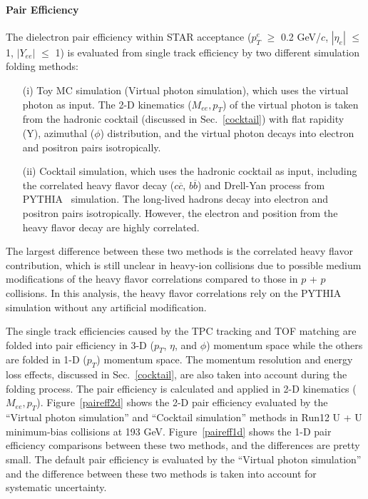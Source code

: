 \paragraph{Pair Efficiency}
The dielectron pair efficiency within STAR acceptance ($p_{T}^{e}$ $\geq$ 0.2 GeV/$c$, $|\eta_{e}|$ $\leq$ 1, $|Y_{ee}|$ $\leq$ 1) is evaluated from single track efficiency by two different simulation folding methods:
\begin{itemize}
\item[(i)] Toy MC simulation (Virtual photon simulation), which uses the virtual photon as input. The 2-D kinematics ($M_{ee}, p_{T}$) of the virtual photon is taken from the hadronic cocktail (discussed in Sec.~\ref{cocktail}) with flat rapidity (Y), azimuthal ($\phi$) distribution, and the virtual photon decays into electron and positron pairs isotropically.
\item[(ii)] Cocktail simulation, which uses the hadronic cocktail as input, including the correlated heavy flavor decay ($c\overline{c}$, $b\overline{b}$) and Drell-Yan process from PYTHIA~\cite{Pythia} simulation. The long-lived hadrons decay into electron and positron pairs isotropically. However, the electron and position from the heavy flavor decay are highly correlated.
\end{itemize} 
The largest difference between these two methods is the correlated heavy flavor contribution, which is still unclear in heavy-ion collisions due to possible medium modifications of the heavy flavor correlations compared to those in $p$ + $p$ collisions. In this analysis, the heavy flavor correlations rely on the PYTHIA simulation without any artificial modification.

The single track efficiencies caused by the TPC tracking and TOF matching are folded into pair efficiency in 3-D ($p_{T}$, $\eta$, and $\phi$) momentum space while the others are folded in 1-D ($p_{T}$) momentum space. The momentum resolution and energy loss effects, discussed in Sec.~\ref{cocktail}, are also taken into account during the folding process. The pair efficiency is calculated and applied in 2-D kinematics ($M_{ee}, p_{T}$). Figure~\ref{paireff2d} shows the 2-D pair efficiency evaluated by the ``Virtual photon simulation'' and ``Cocktail simulation'' methods in Run12 U + U minimum-bias collisions at 193 GeV. Figure~\ref{paireff1d} shows the 1-D pair efficiency comparisons between these two methods, and the differences are pretty small. The default pair efficiency is evaluated by the ``Virtual photon simulation'' and the difference between these two methods is taken into account for systematic uncertainty.  

